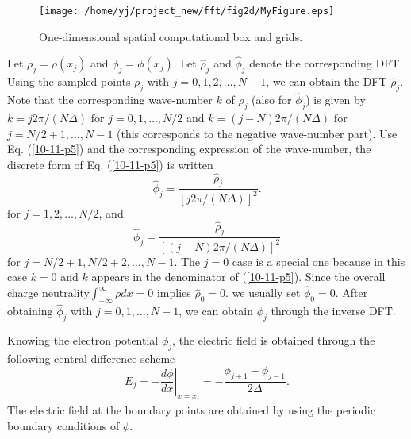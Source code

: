 \documentclass{article}
\begin{document}
\begin{figure}[h]
  \texttt{[image: /home/yj/project\_new/fft/fig2d/MyFigure.eps]}
  \caption{\label{16-2-25-p3}One-dimensional spatial computational box and
  grids.}
\end{figure}

Let $\rho_j = \rho (x_j)$ and $\phi_j = \phi (x_j)$. Let $\hat{\rho}_j$ and
$\hat{\phi}_j$ denote the corresponding DFT. Using the sampled points $\rho_j$
with $j = 0, 1, 2, \ldots, N - 1$, we can obtain the DFT $\hat{\rho}_j$. Note
that the corresponding wave-number $k$ of $\hat{\rho}_j$ (also for
$\hat{\phi}_j$) is given by $k = j 2 \pi / (N \Delta)$ for $j = 0, 1, \ldots,
N / 2$ and $k = (j - N) 2 \pi / (N \Delta)$ for $j = N / 2 + 1, \ldots, N - 1$
(this corresponds to the negative wave-number part). Use Eq. (\ref{10-11-p5})
and the corresponding expression of the wave-number, the discrete form of Eq.
(\ref{10-11-p5}) is written
\begin{equation}
  \label{16-3-25-a8} \hat{\phi}_j = \frac{\hat{\rho}_j}{[j 2 \pi / (N
  \Delta)]^2} .
\end{equation}
for $j = 1, 2, \ldots, N / 2$, and
\begin{equation}
  \label{16-3-25-a9} \hat{\phi}_j = \frac{\hat{\rho}_j}{[(j - N) 2 \pi / (N
  \Delta)]^2}
\end{equation}
for $j = N / 2 + 1, N / 2 + 2, \ldots, N - 1$. The $j = 0$ case is a special
one because in this case $k = 0$ and $k$ appears in the denominator of
(\ref{10-11-p5}). Since the overall charge neutrality$\int_{- \infty}^{\infty}
\rho d x = 0$ implies $\hat{\rho}_0 = 0$. we usually set $\hat{\phi}_0 = 0$.
After obtaining $\hat{\phi}_j$ with $j = 0, 1, \ldots, N - 1$, we can obtain
$\phi_j$ through the inverse DFT.

Knowing the electron potential $\phi_j$, the electric field is obtained
through the following central difference scheme
\begin{equation}
  \left. E_j = - \frac{d \phi}{d x} \right|_{x = x_j} = - \frac{\phi_{j + 1} -
  \phi_{j - 1}}{2 \Delta} .
\end{equation}
The electric field at the boundary points are obtained by using the periodic
boundary conditions of $\phi$.
\end{document}
